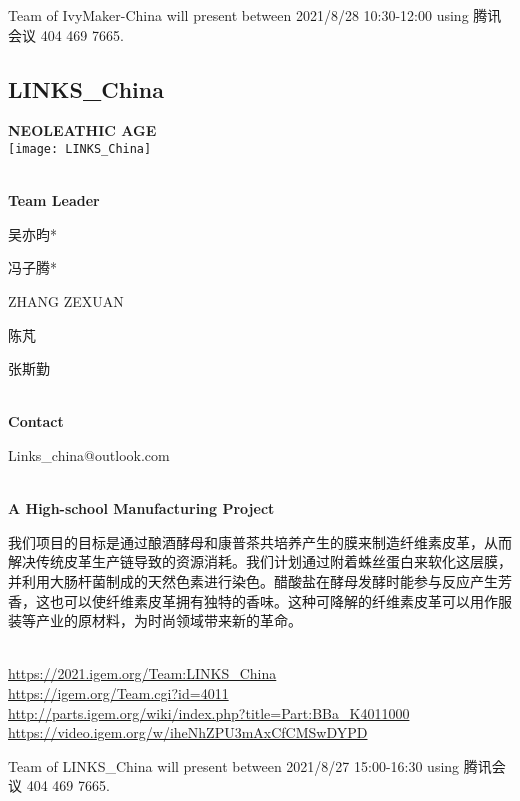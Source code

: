 Team of IvyMaker-China will present between     2021/8/28 10:30-12:00    using 腾讯会议 404 469 7665.
\newpage


\subsection{\textcolor{Blu}{ LINKS\_China } }
\vspace{5mm}
\begin{center}
\large{
  \textbf{ NEOLEATHIC AGE }\\

  \texttt{[image: LINKS\_China]}
}
\end{center}
\textbf{\\Team Leader}

  吴亦昀*

  冯子腾*

  ZHANG ZEXUAN

  陈芃

  张斯勤


\textbf{\\Contact}

  Links\_china@outlook.com


\textbf{\\A High-school Manufacturing Project\\}\begin{spacing}{1.5}

我们项目的目标是通过酿酒酵母和康普茶共培养产生的膜来制造纤维素皮革，从而解决传统皮革生产链导致的资源消耗。我们计划通过附着蛛丝蛋白来软化这层膜，并利用大肠杆菌制成的天然色素进行染色。醋酸盐在酵母发酵时能参与反应产生芳香，这也可以使纤维素皮革拥有独特的香味。这种可降解的纤维素皮革可以用作服装等产业的原材料，为时尚领域带来新的革命。\end{spacing}
\\

\url{https://2021.igem.org/Team:LINKS\_China }\\
\url{https://igem.org/Team.cgi?id=4011 }\\
\url{http://parts.igem.org/wiki/index.php?title=Part:BBa_K4011000 }\\
\url{https://video.igem.org/w/iheNhZPU3mAxCfCMSwDYPD }\\

\vfill{}









Team of LINKS\_China will present between  2021/8/27 15:00-16:30       using 腾讯会议 404 469 7665.
\newpage


